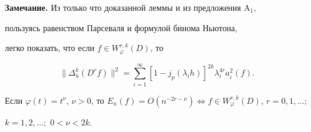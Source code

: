 

 


{\bf Замечание.} Из только что доказанной леммы и из предложения A$_1$, 


пользуясь равенством Парсеваля и формулой бинома Ньютона, 


легко показать, что если $f\in W^{r,k}_\varphi(D)$, то 


$$ 


\|\Delta^k_h(D^r f)\|^2=\sum^\infty_{i=1} 


[1-j_p(\lambda_i h)]^{2k}\lambda^{4r}_i a^2_i(f). 


$$ 


 


\begin{thm} 


Если $\varphi(t)=t^\nu$, $\nu>0$, то $E_n(f)=O(n^{-2r-\nu}) 


\Longleftrightarrow f\in W^{r,k}_\varphi(D)$, $r=0,1,\dotsc;$ 


$k=1,2,\dotsc;$ $0<\nu<2k$. 


\end{thm} 


 


